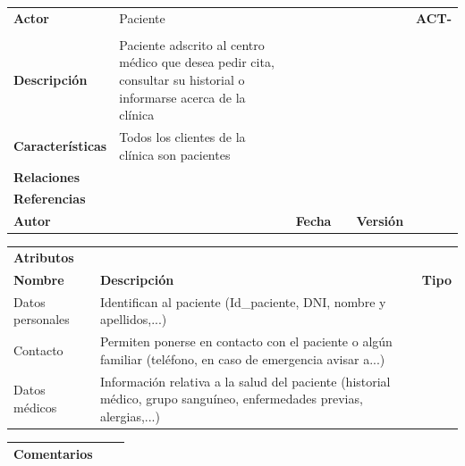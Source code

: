 \documentclass[11pt,a4paper]{article}
\newcounter{ActCounter}
\newcommand{\act}[1]{\addtocounter{ActCounter}{1}\textbf{\rmfamily ACT-\theActCounter}\quad#1\\}
\begin{document}
\begin{table}[h]
\centering
\label{my-label}
\begin{tabular}{l| p{5cm} llll}

\textbf{Actor}           & Paciente & & & & \act \\ 

\textbf{Descripción}     & Paciente adscrito al centro médico que desea pedir cita, consultar su historial o informarse acerca de la clínica & & & & \\
\textbf{Características} & Todos los clientes de la clínica son pacientes  & &  & & \\ 
\textbf{Relaciones}      & & & & & \\ 
\textbf{Referencias}     & & &                                       & \textbf{}                      \\ 
\textbf{Autor}           &  & \textbf{Fecha} &  & \textbf{Versión} & \textbf{}                      \\ 
\end{tabular}
\bigskip
\centering
\label{my-label}
\begin{tabular}{lp{10cm}l}
\textbf{Atributos} &  & \\
\textbf{Nombre}    & \textbf{Descripción} & \textbf{Tipo} \\ \hline
Datos personales   & Identifican al paciente (Id\_paciente, DNI, nombre y apellidos,...)     & \\
Contacto           & Permiten ponerse en contacto con el paciente o algún familiar (teléfono, en caso de emergencia avisar a...) & \\  
Datos médicos      & Información relativa a la salud del paciente (historial médico, grupo sanguíneo, enfermedades previas, alergias,...)            
\end{tabular}
\bigskip
\begin{tabular}{lll}
\textbf{Comentarios} &  &  \\ \hline

\end{tabular}
\end{table}

\end{document}
